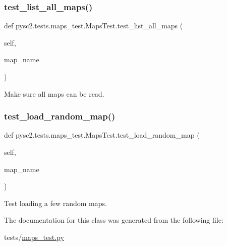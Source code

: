 \subsubsection{\texorpdfstring{test\+\_\+list\+\_\+all\+\_\+maps()}{test\_list\_all\_maps()}}
{\footnotesize\ttfamily def pysc2.\+tests.\+maps\+\_\+test.\+Maps\+Test.\+test\+\_\+list\+\_\+all\+\_\+maps (\begin{DoxyParamCaption}\item[{}]{self,  }\item[{}]{map\+\_\+name }\end{DoxyParamCaption})}

\begin{DoxyVerb}Make sure all maps can be read.\end{DoxyVerb}
 \mbox{\label{classpysc2_1_1tests_1_1maps__test_1_1_maps_test_ad1333103de04d377f36eebf9f18885a0}} 
\subsubsection{\texorpdfstring{test\+\_\+load\+\_\+random\+\_\+map()}{test\_load\_random\_map()}}
{\footnotesize\ttfamily def pysc2.\+tests.\+maps\+\_\+test.\+Maps\+Test.\+test\+\_\+load\+\_\+random\+\_\+map (\begin{DoxyParamCaption}\item[{}]{self,  }\item[{}]{map\+\_\+name }\end{DoxyParamCaption})}

\begin{DoxyVerb}Test loading a few random maps.\end{DoxyVerb}
 

The documentation for this class was generated from the following file\+:\begin{DoxyCompactItemize}
\item 
tests/\mbox{\hyperlink{maps__test_8py}{maps\+\_\+test.\+py}}\end{DoxyCompactItemize}

